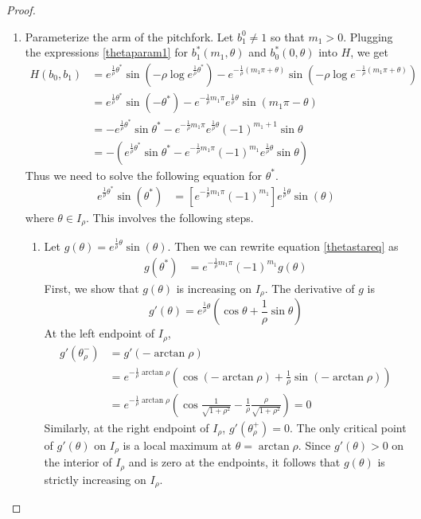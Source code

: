 \documentclass[thesis.tex]{subfiles}
\begin{document}
\begin{lemma}
\begin{proof}
\begin{enumerate}
\item Parameterize the arm of the pitchfork. Let $b_1^0 \neq 1$ so that $m_1 > 0$. Plugging the expressions \eqref{thetaparam1} for $b_1^*(m_1, \theta)$ and $b_0^*(0, \theta)$ into $H$, we get
\begin{align*}
H(b_0, b_1) &= e^{ \frac{1}{\rho}\theta^* } \sin\left( -\rho \log e^{ \frac{1}{\rho}\theta^* }\right) - e^{ -\frac{1}{\rho}(m_1 \pi + \theta) }\sin \left( -\rho \log e^{ -\frac{1}{\rho}(m_1 \pi + \theta) } \right) \\
&= e^{ \frac{1}{\rho}\theta^* } \sin\left( -\theta^* \right) - e^{ -\frac{1}{\rho} m_1 \pi} e^{ \frac{1}{\rho} \theta } \sin(m_1 \pi - \theta) \\
&= -e^{ \frac{1}{\rho}\theta^* } \sin \theta^*  - e^{ -\frac{1}{\rho} m_1 \pi } e^{ \frac{1}{\rho} \theta } (-1)^{m_1 + 1} \sin\theta \\
&= -\left( e^{ \frac{1}{\rho}\theta^* } \sin \theta^* - e^{ -\frac{1}{\rho} m_1 \pi } (-1)^{m_1} e^{ \frac{1}{\rho} \theta } \sin \theta \right)
\end{align*}
Thus we need to solve the following equation for $\theta^*$.
\begin{align}\label{thetastareq}
e^{ \frac{1}{\rho}\theta^* } \sin\left( \theta^* \right) &= \left[ e^{ -\frac{1}{\rho} m_1 \pi } (-1)^{m_1} \right] e^{ \frac{1}{\rho} \theta } \sin(\theta)
\end{align}
where $\theta \in I_\rho$. This involves the following steps.
\begin{enumerate}
	\item Let $g(\theta) = e^{ \frac{1}{\rho} \theta } \sin(\theta)$. Then we can rewrite equation \eqref{thetastareq} as
	\begin{align}\label{thetastareq2}
	g(\theta^*) &= e^{ -\frac{1}{\rho} m_1 \pi } (-1)^{m_1} g(\theta)
	\end{align}
	First, we show that $g(\theta)$ is increasing on $I_\rho$. The derivative of $g$ is 
	\begin{equation}\label{gprime}
	g'(\theta) = e^{ \frac{1}{\rho} \theta } \left( \cos \theta + \frac{1}{\rho} \sin \theta \right)
	\end{equation}
	At the left endpoint of $I_\rho$,
	\begin{align*}
	g'(\theta_\rho^-) &= g'(-\arctan \rho) \\
	 &= e^{ -\frac{1}{\rho} \arctan \rho } \left(\cos(-\arctan \rho) + \frac{1}{\rho} \sin(-\arctan \rho)\right) \\
	&= e^{ -\frac{1}{\rho} \arctan \rho } \left(\cos\frac{1}{\sqrt{1 + \rho^2}} - \frac{1}{\rho} \frac{\rho}{\sqrt{1 + \rho^2}}\right) = 0
	\end{align*}
	Similarly, at the right endpoint of $I_\rho$, $g'(\theta_\rho^+) = 0$.
	The only critical point of $g'(\theta)$ on $I_\rho$ is a local maximum at $\theta = \arctan \rho$. Since $g'(\theta) > 0$ on the interior of $I_\rho$ and is zero at the endpoints, it follows that $g(\theta)$ is strictly increasing on $I_\rho$.
	

\end{enumerate}
\end{enumerate}
\end{proof}
\end{lemma}
\end{document}
